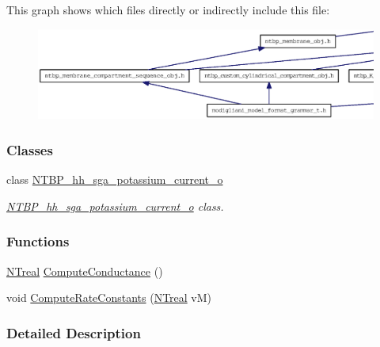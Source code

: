 This graph shows which files directly or indirectly include this file:
\nopagebreak
\begin{figure}[H]
\begin{center}
\leavevmode
\includegraphics[width=400pt]{ntbp__hh__sga__potassium__current__obj_8h__dep__incl}
\end{center}
\end{figure}
\subsubsection*{Classes}
\begin{DoxyCompactItemize}
\item 
class \hyperlink{class_n_t_b_p__hh__sga__potassium__current__o}{NTBP\_\-hh\_\-sga\_\-potassium\_\-current\_\-o}
\begin{DoxyCompactList}\small\item\em \hyperlink{class_n_t_b_p__hh__sga__potassium__current__o}{NTBP\_\-hh\_\-sga\_\-potassium\_\-current\_\-o} class. \item\end{DoxyCompactList}\end{DoxyCompactItemize}
\subsubsection*{Functions}
\begin{DoxyCompactItemize}
\item 
\hyperlink{nt__types_8h_a814a97893e9deb1eedcc7604529ba80d}{NTreal} \hyperlink{ntbp__hh__sga__potassium__current__obj_8h_ad0968a099c78fb50ebdd769e5cde03f9}{ComputeConductance} ()
\item 
void \hyperlink{ntbp__hh__sga__potassium__current__obj_8h_ae29258ed9278fa5d1e82853e97a47e3f}{ComputeRateConstants} (\hyperlink{nt__types_8h_a814a97893e9deb1eedcc7604529ba80d}{NTreal} vM)
\end{DoxyCompactItemize}


\subsubsection{Detailed Description}



